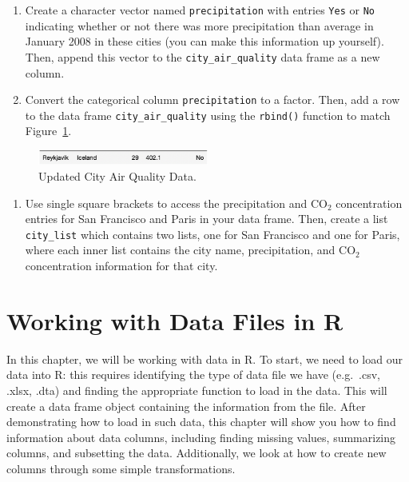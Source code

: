 \documentclass[
  letterpaper,
]{krantz}
\providecommand{\tightlist}{%
  \setlength{\itemsep}{0pt}\setlength{\parskip}{0pt}}\usepackage{longtable,booktabs,array}
\begin{document}
\begin{enumerate}
\def\labelenumi{\arabic{enumi}.}
\setcounter{enumi}{1}
\item
  Create a character vector named \texttt{precipitation} with entries
  \texttt{Yes} or \texttt{No} indicating whether or not there was more
  precipitation than average in January 2008 in these cities (you can
  make this information up yourself). Then, append this vector to the
  \texttt{city\_air\_quality} data frame as a new column.
\item
  Convert the categorical column \texttt{precipitation} to a factor.
  Then, add a row to the data frame \texttt{city\_air\_quality} using
  the \texttt{rbind()} function to match
  Figure~\ref{fig-city-air-quality-2}.
\end{enumerate}

\begin{figure}

{\centering \includegraphics[width=0.5\textwidth,height=\textheight]{book/images/2-exercise3newrow.png}

}

\caption{\label{fig-city-air-quality-2}Updated City Air Quality Data.}

\end{figure}

\begin{enumerate}
\def\labelenumi{\arabic{enumi}.}
\setcounter{enumi}{3}
\tightlist
\item
  Use single square brackets to access the precipitation and
  \(\text{CO}_2\) concentration entries for San Francisco and Paris in
  your data frame. Then, create a list \texttt{city\_list} which
  contains two lists, one for San Francisco and one for Paris, where
  each inner list contains the city name, precipitation, and
  \(\text{CO}_2\) concentration information for that city.
\end{enumerate}


\hypertarget{sec-data-files}{%
\chapter{Working with Data Files in R}\label{sec-data-files}}

In this chapter, we will be working with data in R. To start, we need to
load our data into R: this requires identifying the type of data file we
have (e.g.~.csv, .xlsx, .dta) and finding the appropriate function to
load in the data. This will create a data frame object containing the
information from the file. After demonstrating how to load in such data,
this chapter will show you how to find information about data columns,
including finding missing values, summarizing columns, and subsetting
the data. Additionally, we look at how to create new columns through
some simple transformations.
\end{document}

